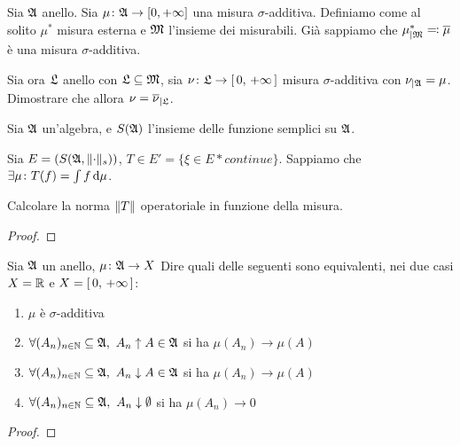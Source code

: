 \documentclass[../EserciziIstituzioniAnalisi.tex]{subfiles}
\begin{document}
\begin{exercise}[2016-10-24]
  Sia $\mathfrak A$ anello.
  Sia $\mu \colon \mathfrak A \to [0,+\infty]$ una misura $\sigma$-additiva.
  Definiamo come al solito $\mu^{*}$ misura esterna e $\mathfrak M$ l'insieme dei misurabili.
  Già sappiamo che $\mu^{*}_{\mid\mathfrak M} \eqqcolon \overline{\mu}$ è una misura $\sigma$-additiva.

  Sia ora $\mathfrak L$ anello con $\mathfrak L \subseteq \mathfrak M$, sia $\nu \colon \mathfrak L \to \left[\,0,\,+\infty\,\right]$ misura $\sigma$-additiva con $\nu_{\mid\mathfrak A} = \mu$.
  Dimostrare che allora $\nu = \overline{\nu}_{\mid\mathfrak L}$.
\end{exercise}

\begin{exercise}[2016-10-14]
  Sia $\mathfrak A$ un'algebra, e $S(\mathfrak A)$ l'insieme delle funzione semplici su $\mathfrak A$.
  
  Sia $E=\left(S(\mathfrak A,\lVert\cdot\rVert_s)\right)$, $T\in E'=\{\xi \in E* continue\}$.
  Sappiamo che $\exists \mu\colon T(f)=\int f \,\mathrm d \mu$.
  
  Calcolare la norma $\lVert T\rVert$ operatoriale in funzione della misura.
\end{exercise}
\begin{proof}
  
\end{proof}
\begin{exercise}[2016-10-14]
  Sia $\mathfrak A$ un anello, $\mu\colon\mathfrak A\to X$
  Dire quali delle seguenti sono equivalenti, nei due casi $X=\mathbb R$ e $X=\left[\,0,\,+\infty\,\right]$:
  \begin{enumerate}
    \item $\mu$ è $\sigma$-additiva
    \item $\forall (A_n)_{n\in\N}\subseteq \gA,\ A_n \uparrow A\in \gA$ si ha $\mu(A_n)\rightarrow \mu(A)$
    \item $\forall (A_n)_{n\in\N}\subseteq \gA,\ A_n \downarrow A\in \gA$ si ha $\mu(A_n)\rightarrow \mu(A)$ 
    \item $\forall (A_n)_{n\in\N}\subseteq \gA,\ A_n \downarrow \emptyset$ si ha $\mu(A_n)\rightarrow 0$
  \end{enumerate}
\end{exercise}
\begin{proof}
  
\end{proof}
\end{document}
